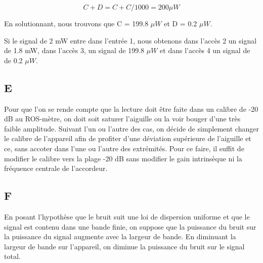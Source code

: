 \begin{equation}
	C+D = C+C/1000 = 200\mu W
\end{equation}

En solutionnant, nous trouvons que C = 199.8 $\mu W$ et D = 0.2 $\mu W$.

Si le signal de 2 mW entre dans l'entrée 1, nous obtenons dans l'accès 2 un signal de 1.8 mW, dans l'accès 3, un signal de 199.8 $\mu W$ et dans l'accès 4 un signal de de 0.2 $\mu W$.

\subsection{E}
Pour que l'on se rende compte que la lecture doit être faite dans un calibre de -20 dB au ROS-mètre, on doit soit saturer l'aiguille ou la voir bouger d'une très faible amplitude. Suivant l'un ou l'autre des cas, on décide de simplement changer le calibre de l'appareil afin de profiter d'une déviation supérieure de l'aiguille et ce, sans accoter dans l'une ou l'autre des extrémités. Pour ce faire, il suffit de modifier le calibre vers la plage -20 dB sans modifier le gain intrinsèque ni la fréquence centrale de l'accordeur. 

\subsection{F}
En posant l'hypothèse que le bruit suit une loi de dispersion uniforme et que le signal est contenu dans une bande finie, on suppose que la puissance du bruit sur la puissance du signal augmente avec la largeur de bande. En diminuant la largeur de bande sur l'appareil, on diminue la puissance du bruit sur le signal total. 




